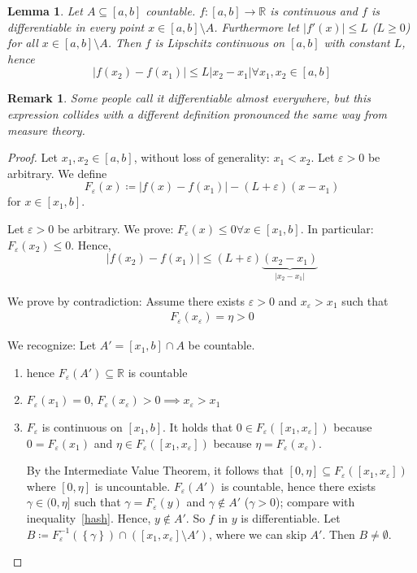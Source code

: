 \documentclass{article}
\newtheorem{lemma}{Lemma}  \numberwithin{lemma}{section}
\newtheorem{remark}{Remark}  \numberwithin{remark}{section}
\newcommand{\set}[1]{\left\{#1\right\}}
\newcommand{\card}[1]{\left|#1\right|}
\begin{document}
\begin{lemma} %
  \label{lemma10}
  Let $A \subseteq [a,b]$ countable.
  $f: [a,b] \to \mathbb R$ is continuous and $f$ is differentiable in every point $x \in [a,b] \setminus A$.
  Furthermore let $\card{f'(x)} \leq L$ ($L \geq 0$) for all $x \in [a,b] \setminus A$.
  Then $f$ is Lipschitz continuous on $[a,b]$ with constant $L$, hence
  \[ \card{f(x_2) - f(x_1)} \leq L \card{x_2 - x_1} \forall x_1, x_2 \in [a,b] \]
\end{lemma}
\begin{remark}
  Some people call it \emph{differentiable almost everywhere},
  but this expression collides with a different definition
  pronounced the same way from measure theory.
\end{remark}
\begin{proof}
  Let $x_1, x_2 \in [a,b]$, without loss of generality: $x_1 < x_2$.
  Let $\varepsilon > 0$ be arbitrary. We define
  \[ F_{\varepsilon}(x) \coloneqq \card{f(x) - f(x_1)} - (L + \varepsilon)(x - x_1) \]
  for $x \in [x_1, b]$.

  Let $\varepsilon > 0$ be arbitrary.
  We prove: $F_{\varepsilon}(x) \leq 0 \forall x \in [x_1, b]$.
  In particular: $F_{\varepsilon}(x_2) \leq 0$. Hence,
  \[ \card{f(x_2) - f(x_1)} \leq (L + \varepsilon)\underbrace{(x_2 - x_1)}_{\card{x_2 - x_1}} \]

  We prove by contradiction:
  Assume there exists $\varepsilon > 0$ and $x_{\varepsilon} > x_1$
  such that
  \begin{align}
    F_{\varepsilon}(x_{\varepsilon}) = \eta > 0
    \label{hash}
  \end{align}

  We recognize:
  Let $A' = [x_1, b] \cap A$ be countable.
  \begin{enumerate}
    \item hence $F_{\varepsilon}(A') \subseteq \mathbb R$ is countable
    \item $F_{\varepsilon}(x_1) = 0$, $F_{\varepsilon}(x_{\varepsilon}) > 0 \implies x_{\varepsilon} > x_1$
    \item $F_{\varepsilon}$ is continuous on $[x_1, b]$.
      It holds that $0 \in F_{\varepsilon}([x_1, x_{\varepsilon}])$ because $0 = F_{\varepsilon}(x_1)$
      and $\eta \in F_{\varepsilon}([x_1, x_{\varepsilon}])$ because $\eta = F_{\varepsilon}(x_{\varepsilon})$.

      By the Intermediate Value Theorem, it follows that $[0, \eta] \subseteq F_{\varepsilon}([x_1, x_{\varepsilon}])$ where $[0, \eta]$ is uncountable.
      $F_{\varepsilon}(A')$ is countable, hence there exists $\gamma \in (0, \eta]$ such that $\gamma = F_{\varepsilon}(y)$ and $\gamma \not\in A'$ ($\gamma > 0$); compare with inequality~\eqref{hash}.
      Hence, $y \not\in A'$. So $f$ in $y$ is differentiable.
      Let $B \coloneqq F_{\varepsilon}^{-1}(\set{\gamma}) \cap \left([x_1, x_{\varepsilon}] \setminus A'\right)$, where we can skip $A'$.
      Then $B \neq \emptyset$.


\end{enumerate}
\end{proof}
\end{document}
